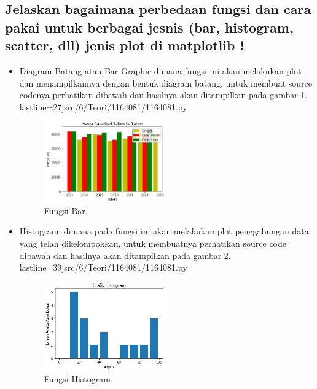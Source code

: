 \subsection{Jelaskan bagaimana perbedaan fungsi dan cara pakai untuk berbagai jesnis (bar, histogram, scatter, dll) jenis plot di matplotlib !}
\begin{itemize}

	\item Diagram Batang atau Bar Graphic dimana fungsi ini akan melakukan plot dan menampilkannya dengan bentuk diagram 			         batang, untuk membuat source codenya perhatikan dibawah dan hasilnya akan ditampilkan pada gambar \ref{2}.
	          lastline=27]{src/6/Teori/1164081/1164081.py}

		\begin{figure}[!htbp!]
			\centerline{\includegraphics[width=0.5\textwidth]{figures/6/Teori/1164081/1164081_2.png}}
			\caption{Fungsi Bar.}
			\label{2}
		\end{figure}

	\item Histogram, dimana pada fungsi ini akan melakukan plot penggabungan data yang telah dikelompokkan, untuk 				         membuatnya perhatikan source code dibawah dan hasilnya akan ditampilkan pada gambar \ref{3}.
	          lastline=39]{src/6/Teori/1164081/1164081.py}

		\begin{figure}[!htbp!]
			\centerline{\includegraphics[width=0.5\textwidth]{figures/6/Teori/1164081/1164081_3.png}}
			\caption{Fungsi Histogram.}
			\label{3}
		\end{figure}


\end{itemize}
